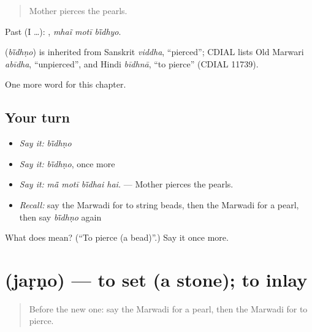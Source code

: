 \begin{quote}
Mother pierces the pearls.
\end{quote}

Past (I …):   , \emph{mhaĩ motī bī̃dhyo}.

\begin{cousinweb}
\textbf{} (\emph{bī̃dhṇo}) is inherited from Sanskrit \emph{viddha}, \textquotedblleft{}pierced\textquotedblright{}; CDIAL lists Old Marwari \emph{abīdha}, \textquotedblleft{}unpierced\textquotedblright{}, and Hindi \emph{bīdhnā}, \textquotedblleft{}to pierce\textquotedblright{} (CDIAL 11739).
\end{cousinweb}

\begin{grammarlens}[title={What you've built}]
One more word for this chapter.
\end{grammarlens}

\subsection*{Your turn}
\begin{itemize}
\raggedright
  \item \emph{Say it:} \emph{bī̃dhṇo}
  \item \emph{Say it:} \emph{bī̃dhṇo}, once more
  \item \emph{Say it:} \emph{mā̃ motī bī̃dhai hai.} — Mother pierces the pearls.
  \item \emph{Recall:} say the Marwadi for to string beads, then the Marwadi for a pearl, then say \emph{bī̃dhṇo} again
\end{itemize}

\begin{tcolorbox}[breakable,colback=teal!4,colframe=teal!35!black,title={Before you move on}]
What does  mean? (\textquotedblleft{}To pierce (a bead)\textquotedblright{}.) Say it once more.
\end{tcolorbox}
\section[\texorpdfstring{\mw{जड़णो} (jaṛṇo)}{जड़णो (jaṛṇo)}]{ (jaṛṇo) — to set (a stone); to inlay}

\label{lesson:MW-C283-jarno}



\begin{quote}
Before the new one: say the Marwadi for a pearl, then the Marwadi for to pierce.
\end{quote}


